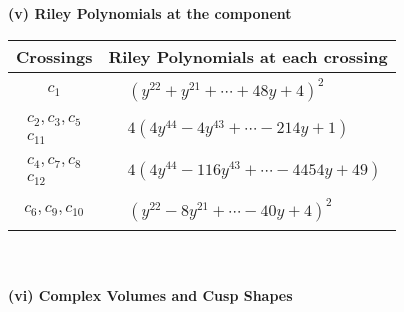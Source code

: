 \documentclass[1p]{elsarticle_modified}
\theoremstyle{definition}
\begin{document}
\newpage\renewcommand{\arraystretch}{1}
\flushleft \textbf{(v) Riley Polynomials at the component}\newline \\
\begin{tabular}{m{50pt}|m{274pt}}
Crossings & \hspace{64pt}Riley Polynomials at each crossing \\
\hline $$\begin{aligned}c_{1}\end{aligned}$$&$\begin{aligned}
&(y^{22}+y^{21}+\cdots+48 y+4)^{2}
\end{aligned}$\\
\hline $$\begin{aligned}c_{2},c_{3},c_{5}\\c_{11}\end{aligned}$$&$\begin{aligned}
&4(4 y^{44}-4 y^{43}+\cdots-214 y+1)
\end{aligned}$\\
\hline $$\begin{aligned}c_{4},c_{7},c_{8}\\c_{12}\end{aligned}$$&$\begin{aligned}
&4(4 y^{44}-116 y^{43}+\cdots-4454 y+49)
\end{aligned}$\\
\hline $$\begin{aligned}c_{6},c_{9},c_{10}\end{aligned}$$&$\begin{aligned}
&(y^{22}-8 y^{21}+\cdots-40 y+4)^{2}
\end{aligned}$\\
\hline
\end{tabular}\\~\\
\newpage\flushleft \textbf{(vi) Complex Volumes and Cusp Shapes}
\end{document}
